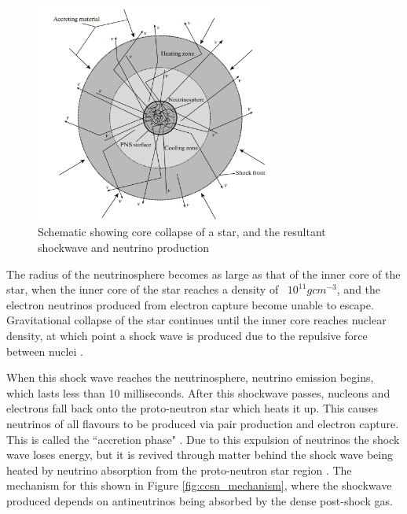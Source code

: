 \begin{figure}
    \centering
    \includegraphics[width=0.7\textwidth]{Figures/neutrinosphere.png}
    \caption{Schematic showing core collapse of a star, and the resultant shockwave and neutrino production}
    \label{fig:neutrinosphere}
\end{figure}


The radius of the neutrinosphere becomes as large as that of the inner core of the star, when the inner core of the star reaches a density of ~$10^{11} gcm^{-3}$, and the electron neutrinos produced from electron capture become unable to escape. Gravitational collapse of the star continues until the inner core reaches nuclear density, at which point a shock wave is produced due to the repulsive force between nuclei \cite{PhysRevLett.60.1999}. 
\newline

When this shock wave reaches the neutrinosphere, neutrino emission begins, which lasts less than 10 milliseconds. After this shockwave passes, nucleons and electrons fall back onto the proto-neutron star which heats it up. This causes neutrinos of all flavours to be produced via pair production and electron capture. This is called the ``accretion phase" \cite{pajkos2019features}. Due to this expulsion of neutrinos the shock wave loses energy, but it is revived through matter behind the shock wave being heated by neutrino absorption from the proto-neutron star region \cite{pascal2022proto}. The mechanism for this shown in Figure \ref{fig:ccsn_mechanism}, where the shockwave produced depends on antineutrinos being absorbed by the dense post-shock gas. 
\newline

